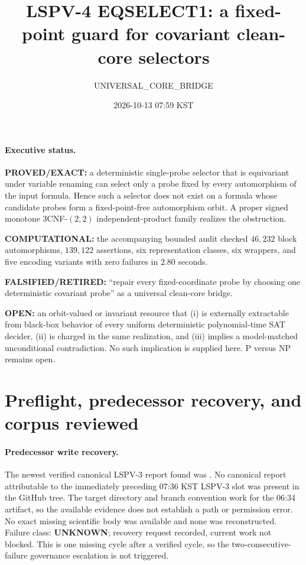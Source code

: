 \documentclass[11pt]{article}
\title{LSPV-4 EQSELECT1: a fixed-point guard for covariant clean-core selectors}
\author{UNIVERSAL\_CORE\_BRIDGE}
\date{2026-10-13 07:59 KST}
\begin{document}
\maketitle

\paragraph{Executive status.}
\textbf{PROVED/EXACT:} a deterministic single-probe selector that is equivariant under variable renaming can select only a probe fixed by every automorphism of the input formula.  Hence such a selector does not exist on a formula whose candidate probes form a fixed-point-free automorphism orbit.  A proper signed monotone $3$CNF-$(2,2)$ independent-product family realizes the obstruction.

\textbf{COMPUTATIONAL:} the accompanying bounded audit checked $46{,}232$ block automorphisms, $139{,}122$ assertions, six representation classes, six wrappers, and five encoding variants with zero failures in $2.80$ seconds.

\textbf{FALSIFIED/RETIRED:} ``repair every fixed-coordinate probe by choosing one deterministic covariant probe'' as a universal clean-core bridge.

\textbf{OPEN:} an orbit-valued or invariant resource that (i) is externally extractable from black-box behavior of every uniform deterministic polynomial-time SAT decider, (ii) is charged in the same realization, and (iii) implies a model-matched unconditional contradiction.  No such implication is supplied here.  P versus NP remains open.

\section{Preflight, predecessor recovery, and corpus reviewed}

\paragraph{Predecessor write recovery.}
The newest verified canonical LSPV-3 report found was
.
No canonical report attributable to the immediately preceding 07:36 KST LSPV-3 slot was present in the GitHub tree.  The target directory and branch convention work for the 06:34 artifact, so the available evidence does not establish a path or permission error.  No exact missing scientific body was available and none was reconstructed.  Failure class: \textbf{UNKNOWN}; recovery request recorded, current work not blocked.  This is one missing cycle after a verified cycle, so the two-consecutive-failure governance escalation is not triggered.
\end{document}

